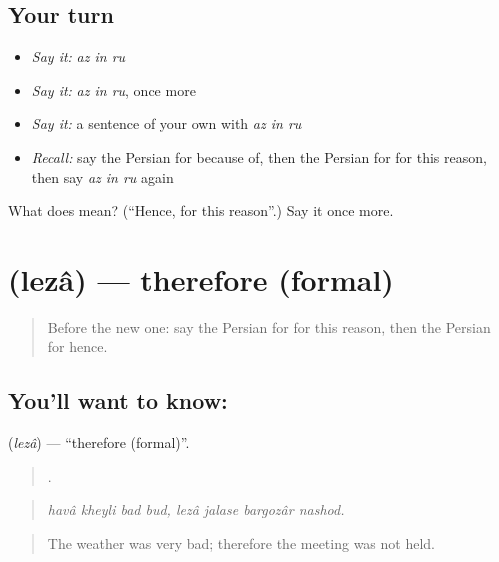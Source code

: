 \subsection*{Your turn}
\begin{itemize}
\raggedright
  \item \emph{Say it:} \emph{az in ru}
  \item \emph{Say it:} \emph{az in ru}, once more
  \item \emph{Say it:} a sentence of your own with \emph{az in ru}
  \item \emph{Recall:} say the Persian for because of, then the Persian for for this reason, then say \emph{az in ru} again
\end{itemize}

\begin{tcolorbox}[breakable,colback=teal!4,colframe=teal!35!black,title={Before you move on}]
What does    mean? (\textquotedblleft{}Hence, for this reason\textquotedblright{}.) Say it once more.
\end{tcolorbox}
\section[\texorpdfstring{\fa{لذا} (lezâ)}{لذا (lezâ)}]{ (lezâ) — therefore (formal)}

\label{lesson:FA-C371-leza}



\begin{quote}
Before the new one: say the Persian for for this reason, then the Persian for hence.
\end{quote}

\subsection*{You'll want to know: }
\textbf{} (\emph{lezâ}) — \textquotedblleft{}therefore (formal)\textquotedblright{}.

\begin{quote}
       .
\end{quote}

\begin{quote}
\emph{havâ kheyli bad bud, lezâ jalase bargozâr nashod.}
\end{quote}

\begin{quote}
The weather was very bad; therefore the meeting was not held.
\end{quote}

